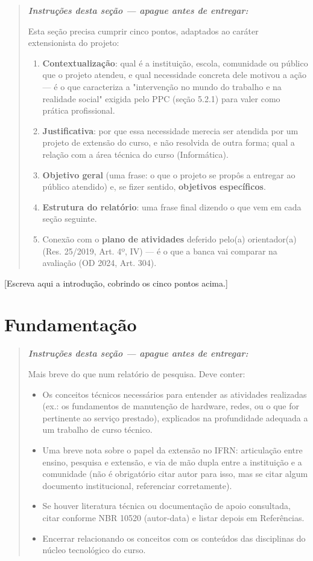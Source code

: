 \documentclass[article,12pt,a4paper]{abntex2}
\newenvironment{instrucoes}{%
  \begin{quotation}\footnotesize\itshape
  \noindent\textbf{\upshape Instruções desta seção — apague antes de entregar:}\par\smallskip
}{%
  \end{quotation}
}
\begin{document}
\begin{instrucoes}
Esta seção precisa cumprir cinco pontos, adaptados ao caráter extensionista do projeto:
\begin{enumerate}
  \item \textbf{Contextualização}: qual é a instituição, escola, comunidade ou público que o projeto atendeu, e qual necessidade concreta dele motivou a ação — é o que caracteriza a "intervenção no mundo do trabalho e na realidade social" exigida pelo PPC (seção 5.2.1) para valer como prática profissional.
  \item \textbf{Justificativa}: por que essa necessidade merecia ser atendida por um projeto de extensão do curso, e não resolvida de outra forma; qual a relação com a área técnica do curso (Informática).
  \item \textbf{Objetivo geral} (uma frase: o que o projeto se propôs a entregar ao público atendido) e, se fizer sentido, \textbf{objetivos específicos}.
  \item \textbf{Estrutura do relatório}: uma frase final dizendo o que vem em cada seção seguinte.
  \item Conexão com o \textbf{plano de atividades} deferido pelo(a) orientador(a) (Res. 25/2019, Art. 4º, IV) — é o que a banca vai comparar na avaliação (OD 2024, Art. 304).
\end{enumerate}
\end{instrucoes}

[Escreva aqui a introdução, cobrindo os cinco pontos acima.]

\section{Fundamentação}

\begin{instrucoes}
Mais breve do que num relatório de pesquisa. Deve conter:
\begin{itemize}
  \item Os conceitos técnicos necessários para entender as atividades realizadas (ex.: os fundamentos de manutenção de hardware, redes, ou o que for pertinente ao serviço prestado), explicados na profundidade adequada a um trabalho de curso técnico.
  \item Uma breve nota sobre o papel da extensão no IFRN: articulação entre ensino, pesquisa e extensão, e via de mão dupla entre a instituição e a comunidade (não é obrigatório citar autor para isso, mas se citar algum documento institucional, referenciar corretamente).
  \item Se houver literatura técnica ou documentação de apoio consultada, citar conforme NBR 10520 (autor-data) e listar depois em Referências.
  \item Encerrar relacionando os conceitos com os conteúdos das disciplinas do núcleo tecnológico do curso.
\end{itemize}
\end{instrucoes}
\end{document}

